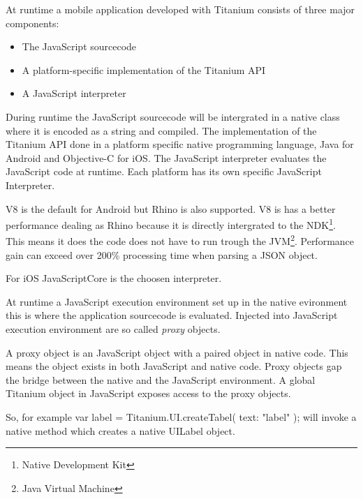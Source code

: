 


At runtime a mobile application developed with Titanium consists of three major components:
\begin{itemize}
	\item
	The JavaScript sourcecode
	\item
	A platform-specific implementation of the Titanium API
	\item
	A JavaScript interpreter
\end{itemize}

During runtime the JavaScript sourcecode will be intergrated in a native class where it is encoded as a string and compiled. The implementation of the Titanium API done in a platform specific native programming language, Java for Android and Objective-C for iOS. The JavaScript interpreter evaluates the JavaScript code at runtime. Each platform has its own specific JavaScript Interpreter.

V8 is the default for Android but Rhino is also supported. V8 is has a better performance dealing as Rhino because it is directly intergrated to the NDK\footnote{Native Development Kit}. This means it does the code does not have to run trough the JVM\footnote{Java Virtual Machine}. Performance gain can exceed over 200\% processing time when parsing a JSON object.\cite{Lukasavage2011}

For iOS JavaScriptCore is the choosen interpreter.

At runtime a JavaScript execution environment set up in the native evironment this is where the application sourcecode is evaluated. Injected into JavaScript execution environment are so called \emph{proxy} objects.

A proxy object is an JavaScript object with a paired object in native code.\cite{Whinnery2012} This means the object exists in both JavaScript and native code. Proxy objects gap the bridge between the native and the JavaScript environment. A global Titanium object in JavaScript exposes access to the proxy objects. 

So, for example var label = Titanium.UI.createTabel({ text: "label" }); will invoke a native method which creates a native UILabel object. 

